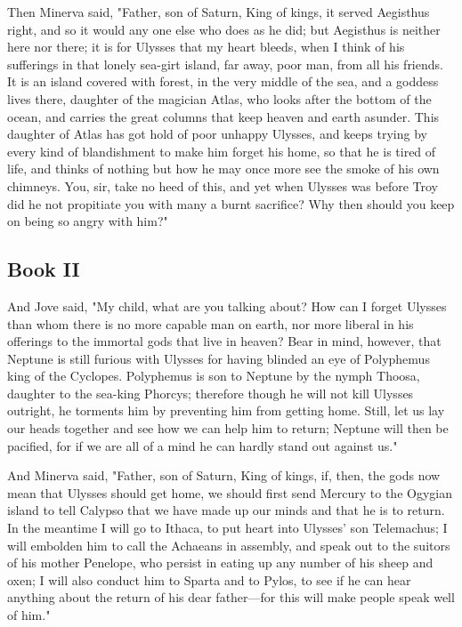 Then Minerva said, "Father, son of Saturn, King of kings, it served Aegisthus
right, and so it would any one else who does as he did; but Aegisthus is
neither here nor there; it is for Ulysses that my heart bleeds, when I think
of his sufferings in that lonely sea-girt island, far away, poor man, from
all his friends. It is an island covered with forest, in the very middle of
the sea, and a goddess lives there, daughter of the magician Atlas, who looks
after the bottom of the ocean, and carries the great columns that keep heaven
and earth asunder. This daughter of Atlas has got hold of poor unhappy Ulysses,
and keeps trying by every kind of blandishment to make him forget his home, so
that he is tired of life, and thinks of nothing but how he may once more see
the smoke of his own chimneys. You, sir, take no heed of this, and yet when
Ulysses was before Troy did he not propitiate you with many a burnt sacrifice?
Why then should you keep on being so angry with him?"

\subsection{Book II}

And Jove said, "My child, what are you talking about? How can I forget Ulysses
 than whom there is no more capable man on earth, nor more liberal in his
 offerings to the immortal gods that live in heaven? Bear in mind, however,
 that Neptune is still furious with Ulysses for having blinded an eye of
 Polyphemus king of the Cyclopes. Polyphemus is son to Neptune by the nymph
 Thoosa, daughter to the sea-king Phorcys; therefore though he will not kill
 Ulysses outright, he torments him by preventing him from getting home. Still,
 let us lay our heads together and see how we can help him to return; Neptune
 will then be pacified, for if we are all of a mind he can hardly stand out
 against us."

And Minerva said, "Father, son of Saturn, King of kings, if, then, the gods
now mean that Ulysses should get home, we should first send Mercury to the
Ogygian island to tell Calypso that we have made up our minds and that he is
to return. In the meantime I will go to Ithaca, to put heart into Ulysses' son
Telemachus; I will embolden him to call the Achaeans in assembly, and speak
out to the suitors of his mother Penelope, who persist in eating up any number
of his sheep and oxen; I will also conduct him to Sparta and to Pylos, to see
if he can hear anything about the return of his dear father—for this will
make people speak well of him."

